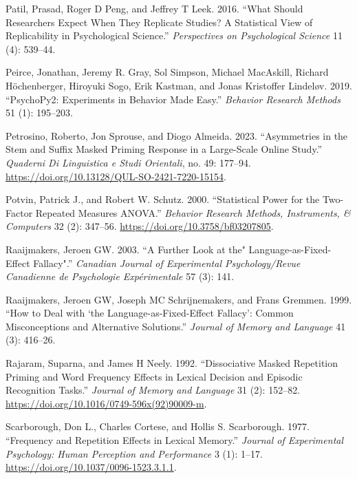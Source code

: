 \documentclass[
]{interact}
\newlength{\cslhangindent}
\newenvironment{CSLReferences}[2] %
 {\begin{list}{}{%
  \setlength{\itemindent}{0pt}
  \setlength{\leftmargin}{0pt}
  \setlength{\parsep}{0pt}
  \ifodd #1
   \setlength{\leftmargin}{\cslhangindent}
   \setlength{\itemindent}{-1\cslhangindent}
  \fi
  \setlength{\itemsep}{#2\baselineskip}}}
 {\end{list}}
\begin{document}
\begin{CSLReferences}{1}{0}
Patil, Prasad, Roger D Peng, and Jeffrey T Leek. 2016. {``What Should
Researchers Expect When They Replicate Studies? A Statistical View of
Replicability in Psychological Science.''} \emph{Perspectives on
Psychological Science} 11 (4): 539--44.

Peirce, Jonathan, Jeremy R. Gray, Sol Simpson, Michael MacAskill,
Richard Höchenberger, Hiroyuki Sogo, Erik Kastman, and Jonas Kristoffer
Lindeløv. 2019. {``PsychoPy2: Experiments in Behavior Made Easy.''}
\emph{Behavior Research Methods} 51 (1): 195--203.

Petrosino, Roberto, Jon Sprouse, and Diogo Almeida. 2023. {``Asymmetries
in the Stem and Suffix Masked Priming Response in a Large-Scale Online
Study.''} \emph{Quaderni Di Linguistica e Studi Orientali}, no. 49:
177--94. \url{https://doi.org/10.13128/QUL-SO-2421-7220-15154}.

Potvin, Patrick J., and Robert W. Schutz. 2000. {``Statistical Power for
the Two-Factor Repeated Measures ANOVA.''} \emph{Behavior Research
Methods, Instruments, \& Computers} 32 (2): 347--56.
\url{https://doi.org/10.3758/bf03207805}.

Raaijmakers, Jeroen GW. 2003. {``A Further Look at the"
Language-as-Fixed-Effect Fallacy".''} \emph{Canadian Journal of
Experimental Psychology/Revue Canadienne de Psychologie Exp{é}rimentale}
57 (3): 141.

Raaijmakers, Jeroen GW, Joseph MC Schrijnemakers, and Frans Gremmen.
1999. {``How to Deal with {`the Language-as-Fixed-Effect Fallacy'}:
Common Misconceptions and Alternative Solutions.''} \emph{Journal of
Memory and Language} 41 (3): 416--26.

Rajaram, Suparna, and James H Neely. 1992. {``Dissociative Masked
Repetition Priming and Word Frequency Effects in Lexical Decision and
Episodic Recognition Tasks.''} \emph{Journal of Memory and Language} 31
(2): 152--82. \url{https://doi.org/10.1016/0749-596x(92)90009-m}.

Scarborough, Don L., Charles Cortese, and Hollis S. Scarborough. 1977.
{``Frequency and Repetition Effects in Lexical Memory.''} \emph{Journal
of Experimental Psychology: Human Perception and Performance} 3 (1):
1--17. \url{https://doi.org/10.1037/0096-1523.3.1.1}.


\end{CSLReferences}
\end{document}
